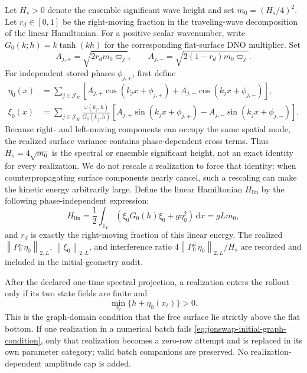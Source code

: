 \documentclass[11pt]{article}
\newcommand{\T}{\mathbb T}
\newcommand{\dd}{\,\mathrm d}
\newcommand{\norm}[1]{\left\lVert #1\right\rVert}
\begin{document}
Let $H_s>0$ denote the ensemble significant wave height and set
$m_0=(H_s/4)^2$.
Let $r_d\in[0,1]$ be the right-moving fraction in the traveling-wave
decomposition of the linear Hamiltonian.
For a positive scalar wavenumber, write
$G_0(k;h)=k\tanh(kh)$ for the corresponding flat-surface DNO multiplier.
Set
\begin{equation}
  A_{j,+}=\sqrt{2r_dm_0\varpi_j},\qquad
  A_{j,-}=\sqrt{2(1-r_d)m_0\varpi_j}.
  \label{eq:jonswap-amplitudes}
\end{equation}
For independent stored phases $\phi_{j,\pm}$, first define
\begin{align}
  \eta_0(x)
  &=\sum_{j\in\mathcal J_K}\left[
    A_{j,+}\cos(k_jx+\phi_{j,+})
    +A_{j,-}\cos(k_jx+\phi_{j,-})
  \right],
  \label{eq:jonswap-eta}\\
  \xi_0(x)
  &=\sum_{j\in\mathcal J_K}\frac{\omega(k_j,h)}{G_0(k_j;h)}
  \left[
    A_{j,+}\sin(k_jx+\phi_{j,+})
    -A_{j,-}\sin(k_jx+\phi_{j,-})
  \right].
  \label{eq:jonswap-xi}
\end{align}
Because right- and left-moving components can occupy the same spatial mode,
the realized surface variance
contains phase-dependent cross terms.  Thus $H_s=4\sqrt{m_0}$ is the spectral
or ensemble significant height, not an exact identity for every realization.
We do not rescale a realization to force that identity: when counterpropagating
surface components nearly cancel, such a rescaling can make the kinetic
energy arbitrarily large.  Define the linear Hamiltonian $H_{\mathrm{lin}}$
by the following phase-independent expression:
\begin{equation}
  H_{\mathrm{lin}}
  =\frac12\int_{\T_L}
    \left(\xi_0G_0(h)\xi_0+g\eta_0^2\right)\dd x
  =gLm_0,
  \label{eq:jonswap-linear-energy}
\end{equation}
and $r_d$ is exactly the right-moving fraction of this linear energy.
The realized $\norm{P_0^\perp\eta_0}_{2,L}$,
$\norm{\xi_0}_{2,L}$, and interference ratio
$4\norm{P_0^\perp\eta_0}_{2,L}/H_s$ are recorded and included in the
initial-geometry audit.

After the declared one-time spectral projection, a realization enters the
rollout only if its two state fields are finite and
\begin{equation}
  \min_{x_\ell}\{h+\eta_0(x_\ell)\}>0.
  \label{eq:jonswap-initial-graph-condition}
\end{equation}
This is the graph-domain condition that the free surface lie strictly above
the flat bottom.  If one realization in a numerical batch fails
\eqref{eq:jonswap-initial-graph-condition}, only that realization becomes a
zero-row attempt and is replaced in its own parameter category; valid batch
companions are preserved.  No realization-dependent amplitude cap is added.
\end{document}
